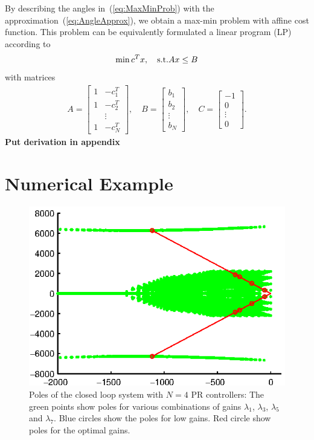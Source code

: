\documentclass[conference,10pt]{IEEEtran}
\begin{document}
By describing the angles in~(\ref{eq:MaxMinProb})
with the approximation~(\ref{eq:AngleApprox}), we obtain a max-min problem with affine cost function. This problem can be equivalently formulated a linear program (LP) according to
\begin{align}
\label{eq:MaxMinProbApprox}
\min c^Tx,\quad {\rm s.t.} Ax\le B
\end{align}
with matrices
\begin{align*}
A =
\begin{bmatrix}
1 & -c^T_1\\
1 & -c^T_2\\
 & \vdots \\
1 & -c^T_N
\end{bmatrix},\quad
B =
\begin{bmatrix}
b_1\\
b_2\\
\vdots \\
b_N
\end{bmatrix},\quad
C =
\begin{bmatrix}
-1\\
0\\
\vdots \\
0
\end{bmatrix}.
\end{align*}
{\bf Put derivation in appendix}




\section{Numerical Example}


\begin{figure}[!h]
\centering

\includegraphics{fig/root_locus}
\caption{Poles of the closed loop system with $N=4$ PR controllers: The green points show poles for various combinations of gains $\lambda_1$, $\lambda_3$, $\lambda_5$ and $\lambda_7$. Blue circles show the poles for low gains. Red circle show poles for the optimal gains. }
\label{fig:PolesOptimalExample}
\end{figure}



\end{document}
